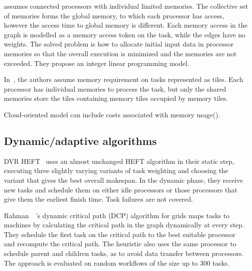 \documentclass[conference]{IEEEtran}
\begin{document}
    \cite{ding2024ils} assumes connected processors with individual limited memories.
    The collective set of memories forms the global memory, to which each processor has access, however the access time
    to global memory is different.
    Each memory access in the graph is modelled as a memory access token on the task, while the edges have no weights.
    The solved problem is how to allocate initial input data in processor memories so that the overall
    execution is minimized and the memories are not exceeded.
    They propose an integer linear programming model.

    In~\cite{rodriguez2019exploration}, the authors assume memory requirement on tasks represented as tiles.
    Each processor has individual memories to process the task, but only the shared memories store the tiles containing
    memory tiles occupied by memory tiles.


    Cloud-oriented model can include costs associated with memory usage(\cite{liang2020memory}).

    \subsection{Dynamic/adaptive algorithms}

    DVR HEFT~\cite{SANDOKJI2019482} uses an almost unchanged HEFT algorithm in their static step, executing three slightly
    varying variants of task weighting and choosing the variant that gives the best overall makespan.
    In the dynamic phase, they receive new tasks and schedule them on either idle processors or those processors that give them
    the earliest finish time.
    Task failures are not covered.

    Rahman~\etal~\cite{rahman2013}'s dynamic critical path (DCP) algorithm for grids maps tasks to machines
    by calculating the critical path in the graph dynamically at every step.
    They schedule the first task on the critical path to the best suitable processor and recompute the critical path.
    The heuristic also uses the same processor to schedule parent and children tasks, as to avoid data transfer between processors.
    The approach is evaluated on random workflows of the size up to 300 tasks.
\end{document}
